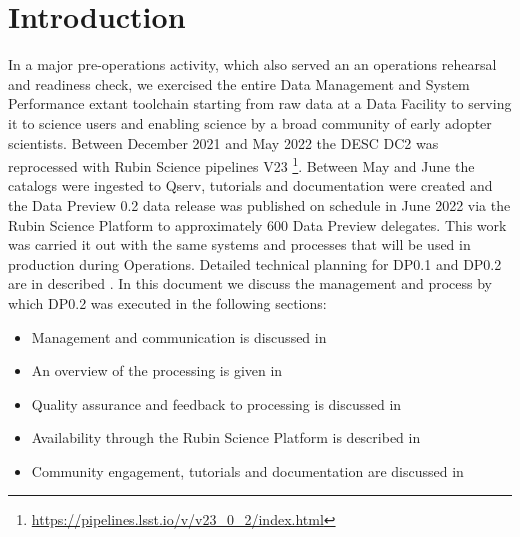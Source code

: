 \section{Introduction}\label{sec:intro}

In a major pre-operations activity, which also served an an operations rehearsal and readiness check, we exercised the entire Data Management and System Performance extant toolchain starting from raw data at a Data Facility to serving it to science users and enabling science by a broad community of early adopter scientists. 
Between December 2021 and May 2022 the DESC DC2 \citep{2021ApJS..253...31L} was reprocessed with Rubin Science pipelines V23 \footnote{\url{https://pipelines.lsst.io/v/v23_0_2/index.html}}.
Between May and June the catalogs were ingested to Qserv, tutorials and documentation were created and the Data Preview 0.2 data release was published on schedule in June 2022 via the Rubin Science Platform to approximately 600 Data Preview delegates.
This work was carried it out with the same systems and processes that will be used in production during Operations.
Detailed technical planning for DP0.1 and DP0.2 are in described .
In this document we discuss the management and process by which DP0.2 was executed in the following sections:

\begin{itemize}
\item Management and communication is discussed in 
\item An overview of the processing is given in 
\item Quality assurance and feedback to processing is discussed in  
\item Availability through the Rubin Science Platform is described in 
\item Community engagement, tutorials and documentation are discussed in 
\end{itemize}
 